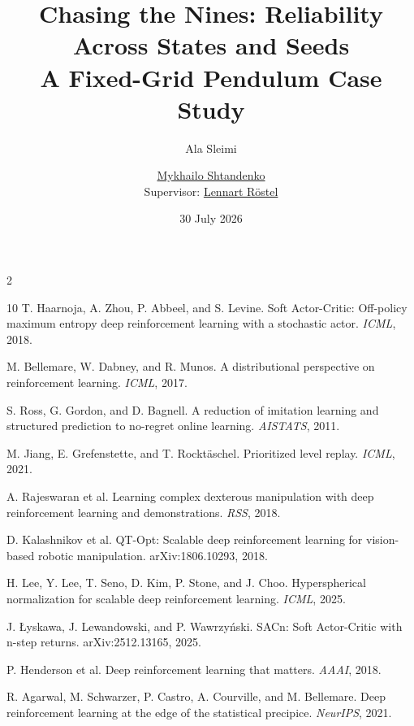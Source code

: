 \documentclass[10pt,twocolumn]{article}
\title{\vspace{-1.2em}\textbf{Chasing the Nines: Reliability Across States and Seeds}\\[-1mm]\large A Fixed-Grid Pendulum Case Study}
\author{Ala Sleimi \and \href{https://www.moodle.tum.de/user/view.php?id=261287\&course=117206}{Mykhailo Shtandenko}\\
\small Supervisor: \href{https://www.moodle.tum.de/user/view.php?id=140042\&course=117206}{Lennart R\"ostel}}
\date{30 July 2026}
\begin{document}


\clearpage
\begin{multicols}{2}
\begin{thebibliography}{10}
T. Haarnoja, A. Zhou, P. Abbeel, and S. Levine.
\newblock Soft Actor-Critic: Off-policy maximum entropy deep reinforcement learning with a stochastic actor.
\newblock \emph{ICML}, 2018.

M. Bellemare, W. Dabney, and R. Munos.
\newblock A distributional perspective on reinforcement learning.
\newblock \emph{ICML}, 2017.

S. Ross, G. Gordon, and D. Bagnell.
\newblock A reduction of imitation learning and structured prediction to no-regret online learning.
\newblock \emph{AISTATS}, 2011.

M. Jiang, E. Grefenstette, and T. Rockt\"{a}schel.
\newblock Prioritized level replay.
\newblock \emph{ICML}, 2021.

A. Rajeswaran et al.
\newblock Learning complex dexterous manipulation with deep reinforcement learning and demonstrations.
\newblock \emph{RSS}, 2018.

D. Kalashnikov et al.
\newblock QT-Opt: Scalable deep reinforcement learning for vision-based robotic manipulation.
\newblock arXiv:1806.10293, 2018.

H. Lee, Y. Lee, T. Seno, D. Kim, P. Stone, and J. Choo.
\newblock Hyperspherical normalization for scalable deep reinforcement learning.
\newblock \emph{ICML}, 2025.

J. {\L}yskawa, J. Lewandowski, and P. Wawrzy{\'n}ski.
\newblock SACn: Soft Actor-Critic with n-step returns.
\newblock arXiv:2512.13165, 2025.

P. Henderson et al.
\newblock Deep reinforcement learning that matters.
\newblock \emph{AAAI}, 2018.

R. Agarwal, M. Schwarzer, P. Castro, A. Courville, and M. Bellemare.
\newblock Deep reinforcement learning at the edge of the statistical precipice.
\newblock \emph{NeurIPS}, 2021.

\end{thebibliography}
\end{multicols}

\ifdefined\REPORTBODYONLY
\else
\clearpage
\appendix

\fi
\end{document}
